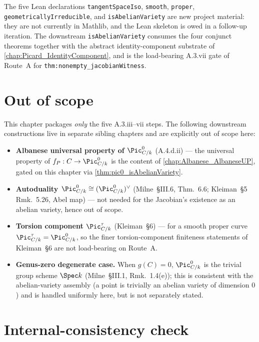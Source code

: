 The five Lean declarations
\texttt{tangentSpaceIso}, \texttt{smooth}, \texttt{proper},
\texttt{geometricallyIrreducible}, and \texttt{isAbelianVariety} are
new project material: they are not currently in Mathlib, and the Lean
skeleton is owed in a follow-up iteration. The downstream
\texttt{isAbelianVariety} consumes the four conjunct theorems together
with the abstract identity-component substrate of
\cref{chap:Picard_IdentityComponent}, and is the load-bearing A.3.vii
gate of Route~A for \texttt{thm:nonempty\_jacobianWitness}.

\section{Out of scope}
\label{sec:pic0_isAbelianVariety_out_of_scope}

This chapter packages \emph{only} the five A.3.iii--vii steps. The
following downstream constructions live in separate sibling chapters
and are explicitly out of scope here:

\begin{itemize}
  \item \textbf{Albanese universal property of \(\Pic^0_{C/k}\)}
    (A.4.d.ii) --- the universal property of \(f_P : C \to \Pic^0_{C/k}\)
    is the content of \cref{chap:Albanese_AlbaneseUP}, gated on this
    chapter via \cref{thm:pic0_isAbelianVariety}.
  \item \textbf{Autoduality \(\Pic^0_{C/k} \cong (\Pic^0_{C/k})^\vee\)}
    (Milne~\S III.6, Thm.~6.6; Kleiman~\S 5 Rmk.~5.26, Abel map) ---
    not needed for the Jacobian's existence as an abelian variety,
    hence out of scope.
  \item \textbf{Torsion component \(\Pic^\tau_{C/k}\)}
    (Kleiman~\S 6) --- for a smooth proper curve
    \(\Pic^\tau_{C/k} = \Pic^0_{C/k}\), so the finer torsion-component
    finiteness statements of Kleiman~\S 6 are not load-bearing on
    Route~A.
  \item \textbf{Genus-zero degenerate case.} When \(g(C) = 0\),
    \(\Pic^0_{C/k}\) is the trivial group scheme \(\Spec k\)
    (Milne~\S III.1, Rmk.~1.4(e)); this is consistent with the
    abelian-variety assembly (a point is trivially an abelian variety
    of dimension \(0\)) and is handled uniformly here, but is not
    separately stated.
\end{itemize}

\section{Internal-consistency check}
\label{sec:pic0_isAbelianVariety_consistency_check}

